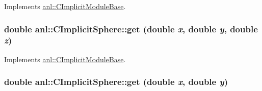 Implements \hyperlink{classanl_1_1CImplicitModuleBase_a3cf520bdab59631864253c03b4e1723f}{anl::CImplicitModuleBase}.\hypertarget{classanl_1_1CImplicitSphere_a8698af16bc095a14992560caf6be36c7}{
\subsubsection[{get}]{\setlength{\rightskip}{0pt plus 5cm}double anl::CImplicitSphere::get (double {\em x}, \/  double {\em y}, \/  double {\em z})}}
\label{classanl_1_1CImplicitSphere_a8698af16bc095a14992560caf6be36c7}


Implements \hyperlink{classanl_1_1CImplicitModuleBase_ac17d592612c82ba3d47f9229a00b1fe3}{anl::CImplicitModuleBase}.\hypertarget{classanl_1_1CImplicitSphere_a215221f358be39ffc2fd09ffe77ca7bc}{
\subsubsection[{get}]{\setlength{\rightskip}{0pt plus 5cm}double anl::CImplicitSphere::get (double {\em x}, \/  double {\em y})}}
\label{classanl_1_1CImplicitSphere_a215221f358be39ffc2fd09ffe77ca7bc}


